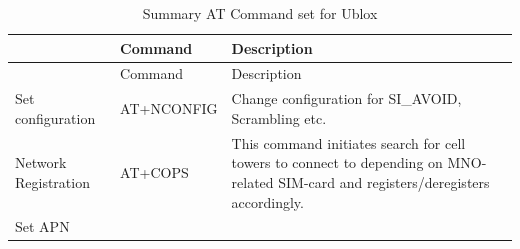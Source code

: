 \documentclass[]{article}
\makeatletter
\newcounter{tableno}
\newenvironment{tablenos:no-prefix-table-caption}{
    \caption@ifcompatibility{}{
    \let\oldthetable\thetable
    \let\oldtheHtable\theHtable
    \renewcommand{\thetable}{tableno:\thetableno}
    \renewcommand{\theHtable}{tableno:\thetableno}
    \stepcounter{tableno}
    \captionsetup{labelformat=empty}
    }
}{
    \caption@ifcompatibility{}{
    \captionsetup{labelformat=default}
    \let\thetable\oldthetable
    \let\theHtable\oldtheHtable
    \addtocounter{table}{-1}
    }
}
\makeatother
\begin{document}
\begin{tablenos:no-prefix-table-caption}

\begin{longtable}[]{@{}lll@{}}
\caption{Summary AT Command set for Ublox }\tabularnewline
\toprule
\begin{minipage}[b]{0.20\columnwidth}\raggedright
\strut
\end{minipage} & \begin{minipage}[b]{0.10\columnwidth}\raggedright
Command\strut
\end{minipage} & \begin{minipage}[b]{0.61\columnwidth}\raggedright
Description\strut
\end{minipage}\tabularnewline
\midrule
\endfirsthead
\toprule
\begin{minipage}[b]{0.20\columnwidth}\raggedright
\strut
\end{minipage} & \begin{minipage}[b]{0.10\columnwidth}\raggedright
Command\strut
\end{minipage} & \begin{minipage}[b]{0.61\columnwidth}\raggedright
Description\strut
\end{minipage}\tabularnewline
\midrule
\endhead
\begin{minipage}[t]{0.20\columnwidth}\raggedright
Set configuration\strut
\end{minipage} & \begin{minipage}[t]{0.10\columnwidth}\raggedright
AT+NCONFIG\strut
\end{minipage} & \begin{minipage}[t]{0.61\columnwidth}\raggedright
Change configuration for SI\_AVOID, Scrambling etc.\strut
\end{minipage}\tabularnewline
\begin{minipage}[t]{0.20\columnwidth}\raggedright
Network Registration\strut
\end{minipage} & \begin{minipage}[t]{0.10\columnwidth}\raggedright
AT+COPS\strut
\end{minipage} & \begin{minipage}[t]{0.61\columnwidth}\raggedright
This command initiates search for cell towers to connect to depending on
MNO-related SIM-card and registers/deregisters accordingly.\strut
\end{minipage}\tabularnewline
\begin{minipage}[t]{0.20\columnwidth}\raggedright
Set APN\strut
\end{minipage} & \begin{minipage}[t]{0.10\columnwidth}\raggedright

\end{minipage}
\end{longtable}
\end{tablenos:no-prefix-table-caption}
\end{document}
